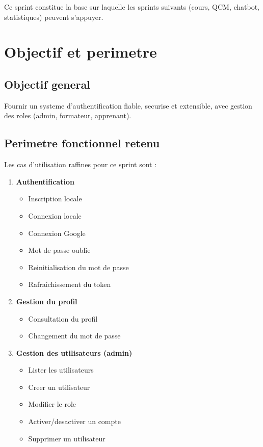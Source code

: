 \documentclass[a4paper,12pt]{report}
\begin{document}
Ce sprint constitue la base sur laquelle les sprints suivants (cours, QCM,
chatbot, statistiques) peuvent s'appuyer.

\section{Objectif et perimetre}

\subsection{Objectif general}

Fournir un systeme d'authentification fiable, securise et extensible, avec
gestion des roles (admin, formateur, apprenant).

\subsection{Perimetre fonctionnel retenu}

Les cas d'utilisation raffines pour ce sprint sont :

\begin{enumerate}
  \item \textbf{Authentification}
  \begin{itemize}
    \item Inscription locale
    \item Connexion locale
    \item Connexion Google
    \item Mot de passe oublie
    \item Reinitialisation du mot de passe
    \item Rafraichissement du token
  \end{itemize}
  \item \textbf{Gestion du profil}
  \begin{itemize}
    \item Consultation du profil
    \item Changement du mot de passe
  \end{itemize}
  \item \textbf{Gestion des utilisateurs (admin)}
  \begin{itemize}
    \item Lister les utilisateurs
    \item Creer un utilisateur
    \item Modifier le role
    \item Activer/desactiver un compte
    \item Supprimer un utilisateur
  \end{itemize}
\end{enumerate}
\end{document}
